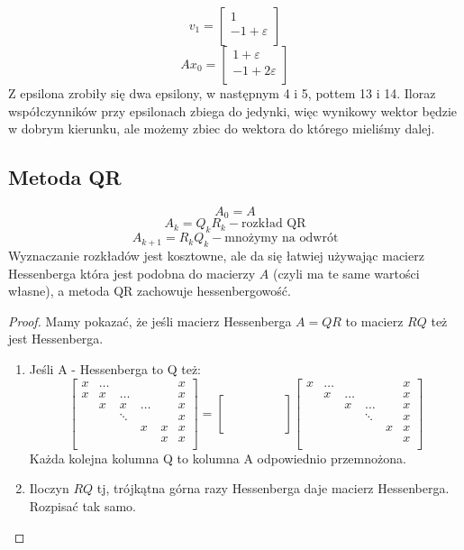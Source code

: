 \documentclass{article}
\begin{document}
$$v_1=\begin{bmatrix}
1\\
-1+\varepsilon\\
\end{bmatrix}$$
$$Ax_0=\begin{bmatrix}
1+\varepsilon\\
-1+2\varepsilon\\
\end{bmatrix}$$ Z epsilona zrobiły się dwa epsilony, w następnym 4 i 5, pottem 13 i 14. Iloraz współczynników przy epsilonach zbiega do jedynki, więc wynikowy wektor będzie w dobrym kierunku, ale możemy zbiec do wektora do którego mieliśmy dalej.
\subsection{Metoda QR}
$$A_0=A$$
$$A_k=Q_kR_k - \text{rozkład QR}$$
$$A_{k+1}=R_kQ_k - \text{mnożymy na odwrót}$$
Wyznaczanie rozkładów jest kosztowne, ale da się łatwiej używając macierz Hessenberga która jest podobna do macierzy $ A $ (czyli ma te same wartości własne), a metoda QR zachowuje hessenbergowość.
\begin{proof}
	Mamy pokazać, że jeśli macierz Hessenberga $ A =QR$  to macierz $ RQ $ też jest Hessenberga.
	\begin{enumerate}
		\item Jeśli A - Hessenberga to Q też:
		$$\begin{bmatrix}
		x&\ldots&&&&x\\
		x&x&\ldots&&&x\\
		&x&x&\ldots&&x\\
		&&\ddots&&&x\\
		&&&x&x&x\\
		&&&&x&x\\
		\end{bmatrix}=\begin{bmatrix}
			&&&&&\\ \\ \\ \\ \\ \\
		\end{bmatrix}\begin{bmatrix}
		x&\ldots&&&&x\\
		&x&\ldots&&&x\\
		&&x&\ldots&&x\\
		&&&\ddots&&x\\
		&&&&x&x\\
		&&&&&x\\
		\end{bmatrix}$$
		Każda kolejna kolumna Q to kolumna A odpowiednio przemnożona.
		\item Iloczyn $ RQ $ tj, trójkątna górna razy Hessenberga daje macierz Hessenberga. Rozpisać tak samo.
	
	\end{enumerate}
\end{proof} 
\end{document}
